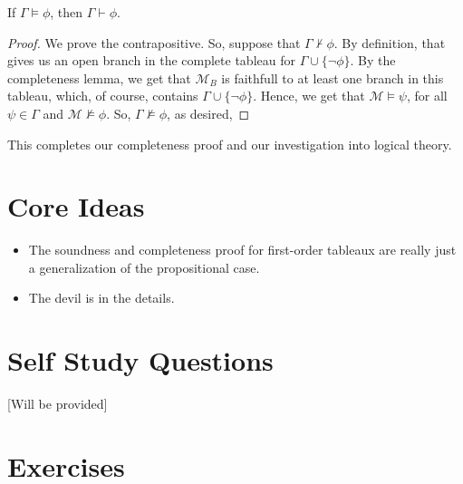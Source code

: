 \begin{enumerate}[\thesection.1]
                    \begin{theorem} If $\Gamma\vDash\phi$, then $\Gamma\vdash\phi$.
                    \end{theorem}
                    \begin{proof}
                      We prove the contrapositive. So, suppose that
                      $\Gamma\nvdash\phi$. By definition, that gives
                      us an open branch in the complete tableau for
                      $\Gamma\cup\{\neg\phi\}$. By the completeness
                      lemma, we get that $\mathcal{M}_B$ is faithfull
                      to at least one branch in this tableau, which,
                      of course, contains
                      $\Gamma\cup\{\neg\phi\}$. Hence, we get that
                      $\mathcal{M}\vDash \psi$, for all
                      $\psi\in\Gamma$ and
                      $\mathcal{M}\nvDash\phi$. So,
                      $\Gamma\nvDash\phi$, as desired,
                    \end{proof}

                    This completes our completeness proof and our
                    investigation into logical theory.
				
	\end{enumerate}        

\section{Core Ideas}

\begin{itemize}
	
		\item The soundness and completeness proof for
                  first-order tableaux are really just a
                  generalization of the propositional case. 

                  \item The devil is in the details.
	
\end{itemize}


\section{Self Study Questions}

[Will be provided]

\newpage

\section{Exercises}

